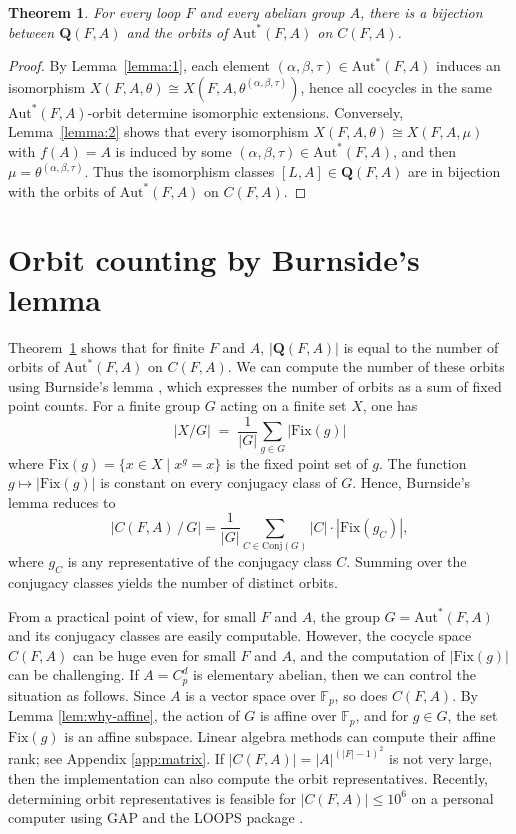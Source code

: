 \documentclass[12pt,a4paper]{amsart}
\newtheorem{theorem}{Theorem}[section]
\theoremstyle{definition}
\newcommand{\boldQ}{\mathbf{Q}}
\begin{document}
\begin{theorem}\label{thm:Q-orbits}
For every loop $F$ and every abelian group $A$, there is a bijection between $\boldQ(F,A)$ and the orbits of $\mathrm{Aut}^{\!*}(F,A)$ on $C(F,A)$. 
\end{theorem}
\begin{proof}
By Lemma~\ref{lemma:1}, each element
$(\alpha,\beta,\tau)\in\mathrm{Aut}^{\!*}(F,A)$ induces an isomorphism $X(F,A,\theta)\cong X(F,A,\theta^{(\alpha,\beta,\tau)})$,
hence all cocycles in the same $\mathrm{Aut}^{\!*}(F,A)$-orbit determine isomorphic extensions. 
Conversely, Lemma~\ref{lemma:2} shows that every isomorphism
$X(F,A,\theta)\cong X(F,A,\mu)$ with $f(A)=A$ is induced by some $(\alpha,\beta,\tau)\in\mathrm{Aut}^{\!*}(F,A)$, and then $\mu=\theta^{(\alpha,\beta,\tau)}$. 
Thus the isomorphism classes $[L,A]\in \boldQ(F,A)$ are in bijection with the orbits of $\mathrm{Aut}^{\!*}(F,A)$ on $C(F,A)$.
\end{proof}


\section{Orbit counting by Burnside's lemma}\label{sec:burnside}

Theorem~\ref{thm:Q-orbits} shows that for finite $F$ and $A$, $|\boldQ(F,A)|$ is equal to the number of orbits of $\mathrm{Aut}^{\!*}(F,A)$ on $C(F,A)$. We can compute the number of these orbits using Burnside's lemma \cite{rotman2012introduction}, which expresses the number of orbits as a sum of fixed point counts. For a finite group $G$ acting on a finite set $X$, one has
\[
 |X/G| \;=\; \frac{1}{|G|} \sum_{g\in G} | \mathrm{Fix}(g)|
\]
where $\mathrm{Fix}(g)=\{x\in X \mid x^{g}=x\}$ is the fixed point set of $g$. The function $g\mapsto |\mathrm{Fix}(g)|$ is constant on every conjugacy class of $G$. Hence, Burnside's lemma reduces to
\[
|C(F,A)\,/\,G|
=
\frac{1}{|G|}
\sum_{C\in\mathrm{Conj}(G)}
|C|\cdot |\mathrm{Fix}(g_C)|,
\]
where $g_{C}$ is any representative of the conjugacy class $C$. Summing over the conjugacy classes yields the number of distinct orbits.

From a practical point of view, for small $F$ and $A$, the group $G=\mathrm{Aut}^{\!*}(F, A)$ and its conjugacy classes are easily computable. However, the cocycle space $C(F, A)$ can be huge even for small $F$ and $A$, and the computation of $|\mathrm{Fix}(g)|$ can be challenging. If $A=C_p^d$ is elementary abelian, then we can control the situation as follows. Since $A$ is a vector space over $\mathbb{F}_p$, so does $C(F,A)$. By Lemma \ref{lem:why-affine}, the action of $G$ is affine over $\mathbb{F}_p$, and for $g\in G$, the set $\mathrm{Fix}(g)$ is an affine subspace. Linear algebra methods can compute their affine rank; see Appendix \ref{app:matrix}. If $|C(F, A)|=|A|^{(|F|-1)^2}$ is not very large, then the implementation can also compute the orbit representatives. Recently, determining orbit representatives is feasible for $|C(F, A)|\leq 10^6$ on a personal computer using GAP \cite{GAP4} and the LOOPS package \cite{nagy2007loops}.
\end{document}
